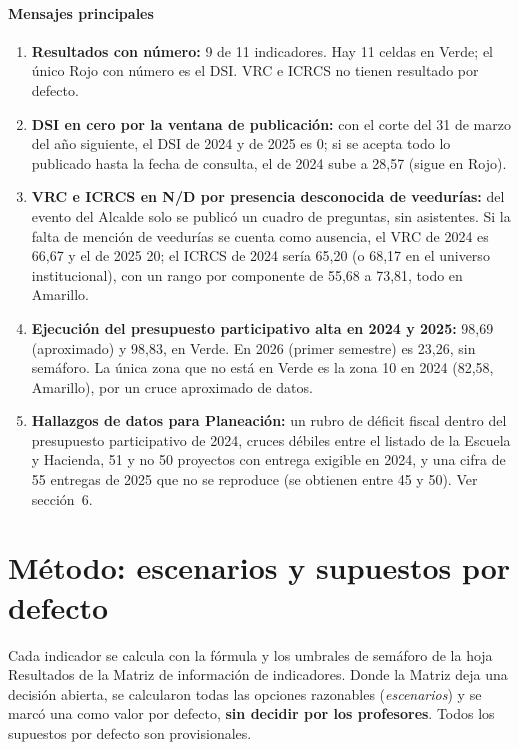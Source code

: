 \documentclass[11pt,letterpaper]{article}
\begin{document}
\paragraph{Mensajes principales}

\begin{enumerate}

\item \textbf{Resultados con número:} 9 de 11 indicadores. Hay 11 celdas en Verde; el único Rojo con número es el DSI. VRC e ICRCS no tienen resultado por defecto.

\item \textbf{DSI en cero por la ventana de publicación:} con el corte del 31 de marzo del año siguiente, el DSI de 2024 y de 2025 es 0; si se acepta todo lo publicado hasta la fecha de consulta, el de 2024 sube a 28,57 (sigue en Rojo).

\item \textbf{VRC e ICRCS en N/D por presencia desconocida de veedurías:} del evento del Alcalde solo se publicó un cuadro de preguntas, sin asistentes. Si la falta de mención de veedurías se cuenta como ausencia, el VRC de 2024 es 66,67 y el de 2025 20; el ICRCS de 2024 sería 65,20 (o 68,17 en el universo institucional), con un rango por componente de 55,68 a 73,81, todo en Amarillo.

\item \textbf{Ejecución del presupuesto participativo alta en 2024 y 2025:} 98,69 (aproximado) y 98,83, en Verde. En 2026 (primer semestre) es 23,26, sin semáforo. La única zona que no está en Verde es la zona 10 en 2024 (82,58, Amarillo), por un cruce aproximado de datos.

\item \textbf{Hallazgos de datos para Planeación:} un rubro de déficit fiscal dentro del presupuesto participativo de 2024, cruces débiles entre el listado de la Escuela y Hacienda, 51 y no 50 proyectos con entrega exigible en 2024, y una cifra de 55 entregas de 2025 que no se reproduce (se obtienen entre 45 y 50). Ver sección~6.

\end{enumerate}

\section{Método: escenarios y supuestos por defecto}

Cada indicador se calcula con la fórmula y los umbrales de semáforo de la hoja Resultados de la Matriz de información de indicadores. Donde la Matriz deja una decisión abierta, se calcularon todas las opciones razonables (\emph{escenarios}) y se marcó una como valor por defecto, \textbf{sin decidir por los profesores}. Todos los supuestos por defecto son provisionales.
\end{document}
